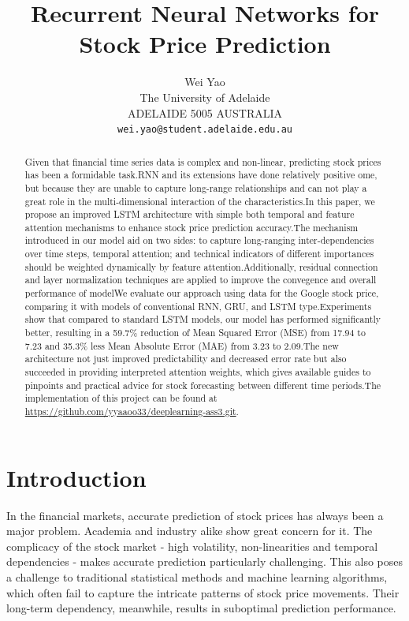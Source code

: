 \documentclass[10pt,twocolumn,letterpaper]{article}
\begin{document}
\title{Recurrent Neural Networks for Stock Price Prediction}

\author{Wei Yao\\
The University of Adelaide\\
ADELAIDE 5005 AUSTRALIA\\
{\tt\small wei.yao@student.adelaide.edu.au}
}
\maketitle


\begin{abstract}
	Given that financial time series data is complex and non-linear, predicting stock prices has been a formidable task.RNN and its extensions have done relatively positive ome, but because they are unable to capture long-range relationships and can not play a great role in the multi-dimensional interaction of the characteristics.In this paper, we propose an improved LSTM architecture with simple both  temporal and feature attention mechanisms to enhance stock price prediction accuracy.The mechanism introduced in our model aid on two sides: to capture long-ranging inter-dependencies over time steps, temporal attention; and technical indicators of different importances should be weighted dynamically by feature attention.Additionally, residual connection and layer normalization techniques are applied to improve the convegence and overall performance of modelWe evaluate our approach using data for the Google stock price, comparing it with models of conventional RNN, GRU, and LSTM type.Experiments show that compared to standard LSTM models, our model has performed significantly better, resulting in a 59.7\% reduction of Mean Squared Error (MSE) from 17.94 to 7.23 and 35.3\% less Mean Absolute Error (MAE) from 3.23 to 2.09.The new architecture not just improved predictability and decreased error rate but also succeeded in providing interpreted attention weights, which gives available guides to pinpoints and practical advice for stock forecasting between different time periods.The implementation of this project can be found at \url{https://github.com/yyaaoo33/deeplearning-ass3.git}.
\end{abstract}

\section{Introduction}
In the financial markets, accurate prediction of stock prices has always been a major problem. Academia and industry alike show great concern for it. The complicacy of the stock market - high volatility, non-linearities and temporal dependencies - makes accurate prediction particularly challenging. This also poses a challenge to traditional statistical methods and machine learning algorithms, which often fail to capture the intricate patterns of stock price movements. Their long-term dependency, meanwhile, results in suboptimal prediction performance.
\end{document}
